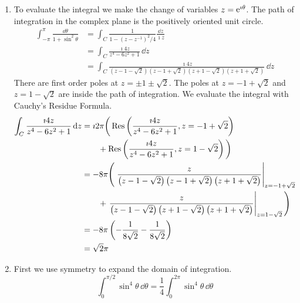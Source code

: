 {\begin{Solution}
  \label{solution dq 1+sin2 q}
  \begin{enumerate}
  \item 
    To evaluate the integral we make the change of variables $z = \mathop{\mathrm{e}}\nolimits^{\imath \theta}$.
    The path of integration in the complex plane is the positively oriented
    unit circle.
    \begin{align*}
      \int_{-\pi}^\pi \frac{\dd \theta}{1 + \sin^2 \theta}
      &= \int_C \frac{1}{ 1 - \left( z - z^{-1} \right)^2 / 4 }  \frac{\dd z}{\imath z}
      \\
      &= \int_C \frac{\imath 4 z}{ z^4 - 6 z^2 + 1 }\,\dd z
      \\
      &= \int_C \frac{\imath 4 z}{ 
        \left( z - 1 - \sqrt{2} \right)
        \left( z - 1 + \sqrt{2} \right)
        \left( z + 1 - \sqrt{2} \right)
        \left( z + 1 + \sqrt{2} \right)
        }\,\dd z
    \end{align*}
    There are first order poles at $z = \pm 1 \pm \sqrt{2}$.  The poles at 
    $z = -1 + \sqrt{2}$ and $z = 1 - \sqrt{2}$ are inside the path of 
    integration.  We evaluate the integral with Cauchy's Residue Formula.
    \begin{align*}
      \int_C \frac{\imath 4 z}{ z^4 - 6 z^2 + 1 }\,\mathrm{d} z
      &= \imath 2 \pi \bigg( 
      \mathop{\mathrm{Res}}\nolimits \left( \frac{\imath 4 z}{ z^4 - 6 z^2 + 1 }, z = -1 + \sqrt{2} \right)
      \\
      &\qquad 
      + \mathop{\mathrm{Res}}\nolimits \left( \frac{\imath 4 z}{ z^4 - 6 z^2 + 1 }, z = 1 - \sqrt{2} \right)
      \bigg)
      \\
      &= - 8 \pi \Bigg(
      \left. \frac{z}{ 
          \left( z - 1 - \sqrt{2} \right)
          \left( z - 1 + \sqrt{2} \right)
          \left( z + 1 + \sqrt{2} \right)
          } \right|_{z = -1 + \sqrt{2}}
      \\
      &\qquad + \left. \frac{z}{ 
          \left( z - 1 - \sqrt{2} \right)
          \left( z + 1 - \sqrt{2} \right)
          \left( z + 1 + \sqrt{2} \right)
          } \right|_{z = 1 - \sqrt{2}}
      \Bigg)
      \\
      &= - 8 \pi \left( - \frac{1}{8 \sqrt{2}} - \frac{1}{8 \sqrt{2}} \right)
      \\
      &= 
      \sqrt{2} \pi
    \end{align*}
  \item 
    First we use symmetry to expand the domain of integration.
    \[
    \int_0^{\pi/2} \sin^4 \theta\,\dd \theta
    = \frac{1}{4} \int_0^{2 \pi} \sin^4 \theta\,\dd \theta
\]
\end{enumerate}
\end{Solution}}

